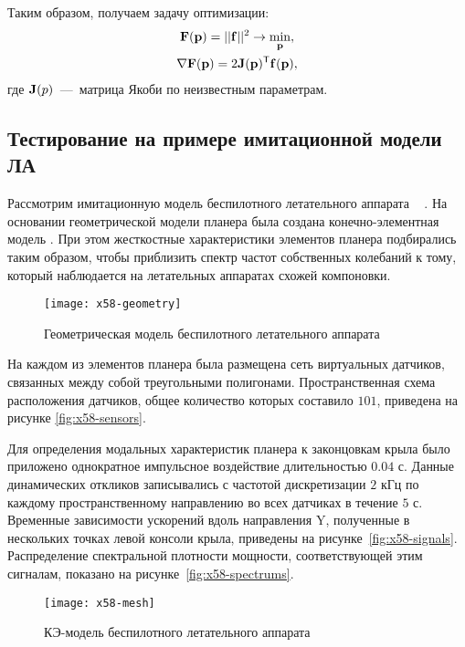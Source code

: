 Таким образом, получаем задачу оптимизации:
\begin{equation}
	\begin{gathered}
		\mathbf{F}(\mathbf{p}) = \vert \vert \mathbf{f} \vert \vert ^ 2 \rightarrow \min_{\mathbf{p}}, \\
		\nabla \mathbf{F(\mathbf{p})} = 2 \mathbf{J}(\mathbf{p}) ^ \mathsf{T} \mathbf{f(\mathbf{p})},
	\end{gathered}
\end{equation}
где $ \mathbf{J}(p) $~---~матрица Якоби по неизвестным параметрам.

\subsection{Тестирование на примере имитационной модели ЛА}

Рассмотрим имитационную модель беспилотного летательного аппарата ~ \cite{lib:misc:x58}. На основании геометрической модели планера была создана конечно-элементная модель  . При этом жесткостные характеристики элементов планера подбирались таким образом, чтобы приблизить спектр частот собственных колебаний к тому, который наблюдается на летательных аппаратах схожей компоновки.

\begin{figure}[!htb]
	\centerfloat
	\texttt{[image: x58-geometry]}
	\caption{Геометрическая модель беспилотного летательного аппарата} \label{fig:x58-geometry}
\end{figure}

На каждом из элементов планера была размещена сеть виртуальных датчиков, связанных между собой треугольными полигонами. Пространственная схема расположения датчиков, общее количество которых составило $ 101 $, приведена на рисунке \ref{fig:x58-sensors}.

Для определения модальных характеристик планера к законцовкам крыла было приложено однократное импульсное воздействие длительностью $ 0.04 $ с. Данные динамических откликов записывались с частотой дискретизации $ 2 $ кГц по каждому пространственному направлению во всех датчиках в течение $ 5 $ с. Временные зависимости ускорений вдоль направления Y, полученные в нескольких точках левой консоли крыла, приведены на рисунке~\ref{fig:x58-signals}. Распределение спектральной плотности мощности, соответствующей этим сигналам, показано на рисунке~\ref{fig:x58-spectrums}.

\begin{figure}[!htb]
	\centerfloat
	\texttt{[image: x58-mesh]}
	\caption{КЭ-модель беспилотного летательного аппарата} \label{fig:x58-mesh}
\end{figure}

